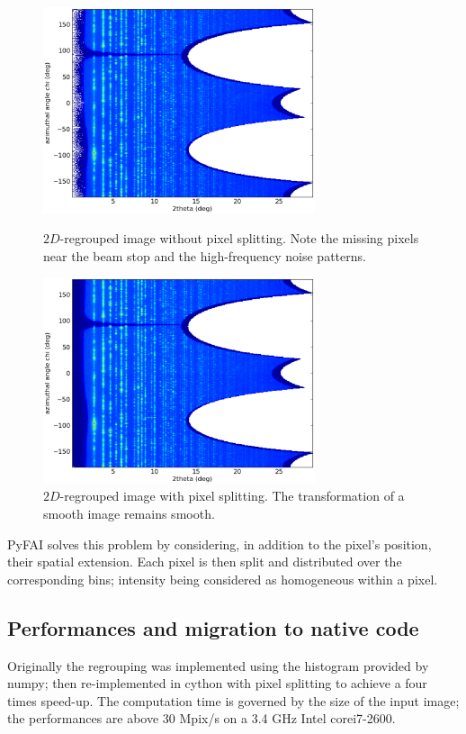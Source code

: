 \documentclass[a4paper]{jpconf}
\begin{document}
\begin{figure}[h]
\begin{minipage}{8cm}
\includegraphics[width=8cm]{img/2Dhistogram.eps}
\caption{\label{rough}$2D$-regrouped image without pixel splitting. Note
the missing pixels near the beam stop and the high-frequency noise patterns.}
\end{minipage}\hspace{5mm}
\begin{minipage}{8cm}
\includegraphics[width=8cm]{img/2DwithSplit.eps}
\caption{\label{smooth}$2D$-regrouped image with pixel splitting. The
transformation of a smooth image remains smooth.}
\end{minipage}
\end{figure}

PyFAI solves this problem by considering, in addition to the pixel's position,
their spatial extension. Each pixel is then split and distributed over the
corresponding bins; intensity being considered as homogeneous within a pixel.

\subsection{Performances and migration to native code}
Originally the regrouping was implemented
using the histogram provided by numpy\cite{numpy}; then re-implemented in
cython\cite{cython} with pixel splitting to achieve a four times speed-up.
The computation time is governed by the size of the input image; the performances
are above 30 Mpix/s on a 3.4 GHz Intel corei7-2600.
\end{document}
